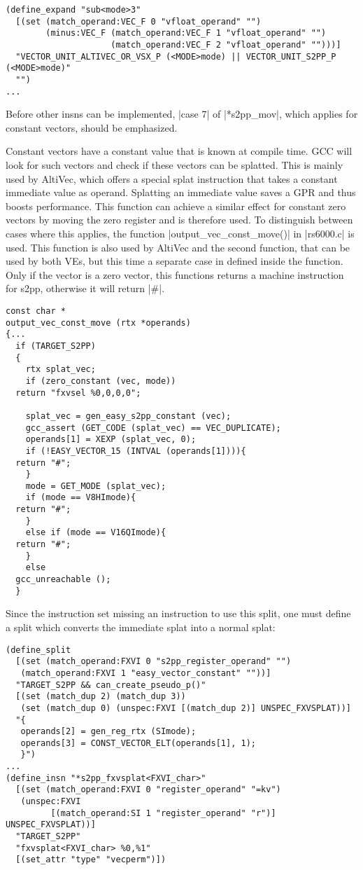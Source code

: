 \begin{lstlisting}
(define_expand "sub<mode>3"
  [(set (match_operand:VEC_F 0 "vfloat_operand" "")
        (minus:VEC_F (match_operand:VEC_F 1 "vfloat_operand" "")
                     (match_operand:VEC_F 2 "vfloat_operand" "")))]
  "VECTOR_UNIT_ALTIVEC_OR_VSX_P (<MODE>mode) || VECTOR_UNIT_S2PP_P (<MODE>mode)"
  "")
...
\end{lstlisting}

Before other insns can be implemented, |case 7| of |*s2pp_mov|, which applies for constant vectors, should be emphasized.

Constant vectors have a constant value that is known at compile time.
\ac{GCC} will look for such vectors and check if these vectors can be splatted.
This is mainly used by AltiVec, which offers a special splat instruction that takes a constant immediate value as operand.
Splatting an immediate value saves a \ac{GPR} and thus boosts performance.
This function can achieve a similar effect for constant zero vectors by moving the zero register and is therefore used.
To distinguish between cases where this applies, the function |output_vec_const_move()| in |rs6000.c| is used.
This function is also used by AltiVec and the second function, that can be used by both \acp{VE}, but this time a separate case in defined inside the function.
Only if the vector is a zero vector, this functions returns a machine instruction for \ac{s2pp}, otherwise it will return |#|.
\begin{lstlisting}
const char *
output_vec_const_move (rtx *operands)
{...
  if (TARGET_S2PP)
  {
    rtx splat_vec;
    if (zero_constant (vec, mode))
  return "fxvsel %0,0,0,0";

    splat_vec = gen_easy_s2pp_constant (vec);
    gcc_assert (GET_CODE (splat_vec) == VEC_DUPLICATE);
    operands[1] = XEXP (splat_vec, 0);
    if (!EASY_VECTOR_15 (INTVAL (operands[1]))){
  return "#";
    }
    mode = GET_MODE (splat_vec);
    if (mode == V8HImode){
  return "#";
    }
    else if (mode == V16QImode){
  return "#";
    }
    else
  gcc_unreachable ();
  }
\end{lstlisting}

Since the instruction set missing an instruction to use this split, one must define a split  which converts the immediate splat into a normal splat:
\begin{lstlisting}
(define_split
  [(set (match_operand:FXVI 0 "s2pp_register_operand" "")
   (match_operand:FXVI 1 "easy_vector_constant" ""))]
  "TARGET_S2PP && can_create_pseudo_p()"
  [(set (match_dup 2) (match_dup 3))
   (set (match_dup 0) (unspec:FXVI [(match_dup 2)] UNSPEC_FXVSPLAT))]
  "{
   operands[2] = gen_reg_rtx (SImode);
   operands[3] = CONST_VECTOR_ELT(operands[1], 1);
   }")
...
(define_insn "*s2pp_fxvsplat<FXVI_char>"
  [(set (match_operand:FXVI 0 "register_operand" "=kv")
   (unspec:FXVI
         [(match_operand:SI 1 "register_operand" "r")] UNSPEC_FXVSPLAT))]
  "TARGET_S2PP"
  "fxvsplat<FXVI_char> %0,%1"
  [(set_attr "type" "vecperm")])
\end{lstlisting}

